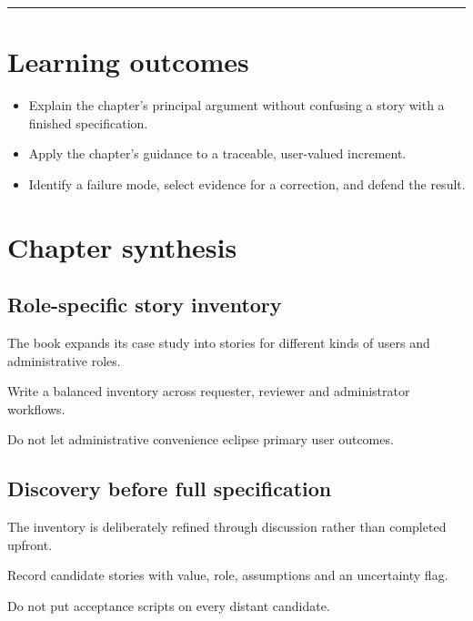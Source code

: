 \documentclass[11pt,letterpaper]{article}
\begin{document}
\tableofcontents\medskip\noindent\rule{\linewidth}{0.4pt}\medskip
\section{Learning outcomes}
\begin{itemize}[leftmargin=*,itemsep=2pt]
\item Explain the chapter's principal argument without confusing a story with a finished specification.
\item Apply the chapter's guidance to a traceable, user-valued increment.
\item Identify a failure mode, select evidence for a correction, and defend the result.
\end{itemize}
\section{Chapter synthesis}
\subsection{Role-specific story inventory}
The book expands its case study into stories for different kinds of users and administrative roles.

\begin{tcolorbox}[colback=tealback,colframe=navy,title={Engineering translation},breakable]
Write a balanced inventory across requester, reviewer and administrator workflows.

\end{tcolorbox}
\begin{tcolorbox}[colback=amberback,colframe=navy,title={Failure mode to watch},breakable]
Do not let administrative convenience eclipse primary user outcomes.

\end{tcolorbox}
\subsection{Discovery before full specification}
The inventory is deliberately refined through discussion rather than completed upfront.

\begin{tcolorbox}[colback=tealback,colframe=navy,title={Engineering translation},breakable]
Record candidate stories with value, role, assumptions and an uncertainty flag.

\end{tcolorbox}
\begin{tcolorbox}[colback=amberback,colframe=navy,title={Failure mode to watch},breakable]
Do not put acceptance scripts on every distant candidate.

\end{tcolorbox}
\end{document}
